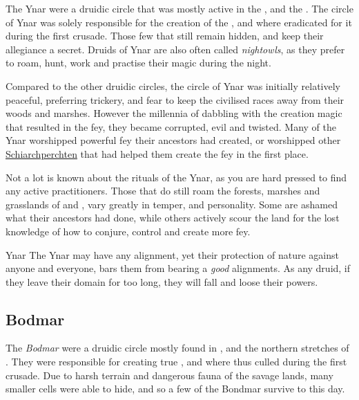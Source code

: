 The Ynar were a druidic circle that was mostly active in the
, and the . The circle
of Ynar was solely responsible for the creation of the , and
where eradicated for it during the first crusade. Those few that still remain
hidden, and keep their allegiance a secret. Druids of Ynar are also often
called \emph{nightowls}, as they prefer to roam, hunt, work and practise their
magic during the night.

Compared to the other druidic circles, the circle of Ynar was initially
relatively peaceful, preferring trickery, and fear to keep the civilised races
away from their woods and marshes. However the millennia of dabbling with the
creation magic that resulted in the fey, they became corrupted, evil and
twisted. Many of the Ynar worshipped powerful fey their ancestors had created,
or worshipped other \hyperref[sec:Percht]{Schiarchperchten} that had helped
them create the fey in the first place.

Not a lot is known about the rituals of the Ynar, as you are hard pressed to
find any active practitioners. Those that do still roam the forests, marshes
and grasslands of  and , vary
greatly in temper, and personality. Some are ashamed what their ancestors had
done, while others actively scour the land for the lost knowledge of how to
conjure, control and create more fey.

\begin{35e}{Ynar}
  The Ynar may have any alignment, yet their protection of nature against
  anyone and everyone, bars them from bearing a \emph{good} alignments. As any
  druid, if they leave their domain for too long, they will fall and loose
  their powers.
\end{35e}

\subsection{Bodmar}
\label{sec:Bodmar}

The \emph{Bodmar} were a druidic circle mostly found in ,
 and the northern stretches of .
They were responsible for creating true , and where
thus culled during the first crusade. Due to harsh terrain and dangerous fauna
of the savage lands, many smaller cells were able to hide, and so a few of the
Bondmar survive to this day.

